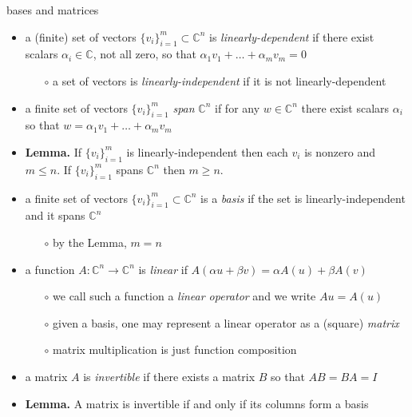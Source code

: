 \documentclass[10pt,hyperref]{beamer}
\newcommand{\CC}{\mathbb{C}}
\begin{document}
\begin{frame}{bases and matrices}

\begin{itemize}
\item a (finite) set of vectors $\{v_i\}_{i=1}^m \subset \CC^n$ is \emph{linearly-dependent} if there exist scalars $\alpha_i \in \CC$, not all zero, so that $\alpha_1 v_1 + \dots + \alpha_m v_m = 0$
    \begin{itemize}
    \item[$\circ$] a set of vectors is \emph{linearly-independent} if it is not linearly-dependent
    \end{itemize}
\item a finite set of vectors $\{v_i\}_{i=1}^m$ \emph{span} $\CC^n$ if for any $w\in \CC^n$ there exist scalars $\alpha_i$ so that $w = \alpha_1 v_1 + \dots + \alpha_m v_m$
\item \textbf{Lemma.}  If $\{v_i\}_{i=1}^m$ is linearly-independent then each $v_i$ is nonzero and $m \le n$.  If $\{v_i\}_{i=1}^m$ spans $\CC^n$ then $m \ge n$.
\item a finite set of vectors $\{v_i\}_{i=1}^m \subset \CC^n$ is a \emph{basis} if the set is linearly-independent and it spans $\CC^n$
    \begin{itemize}
    \item[$\circ$] by the Lemma, $m=n$
    \end{itemize}
\item a function $A:\CC^n \to \CC^n$ is \emph{linear} if $A(\alpha u+\beta v) = \alpha A(u) + \beta A(v)$
    \begin{itemize}
    \item[$\circ$] we call such a function a \emph{linear operator} and we write $Au=A(u)$
    \item[$\circ$] given a basis, one may represent a linear operator as a (square) \emph{matrix}
    \item[$\circ$] matrix multiplication is just function composition
    \end{itemize}
\item a matrix $A$ is \emph{invertible} if there exists a matrix $B$ so that $AB=BA=I$
\item \textbf{Lemma.} A matrix is invertible if and only if its columns form a basis
\end{itemize}
\end{frame}
\end{document}
